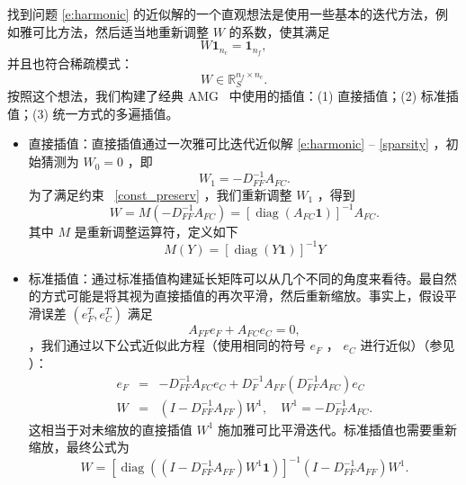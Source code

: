\documentclass[12pt]{acta_2011xz}
\begin{document}
找到问题    \eqref{e:harmonic}    的近似解的一个直观想法是使用一些基本的迭代方法，例如雅可比方法，然后适当地重新调整    $W$    的系数，使其满足    \begin{equation}\label{const_preserv}
     W\boldsymbol 1_{n_c}=\boldsymbol 1_{n_f},
 \end{equation}    并且也符合稀疏模式：
   \begin{equation}\label{sparsity}
     W\in \mathbb{R}_{S}^{n_f\times n_c}.
 \end{equation}    按照这个想法，我们构建了经典 AMG~    \cite[Section~A.7]{Trottenberg.U;Oosterlee.C;Schuller.A.2001a}    中使用的插值：(1) 直接插值；(2) 标准插值；(3) 统一方式的多遍插值。
   \begin{itemize}

   \item   直接插值：直接插值通过一次雅可比迭代近似解 
   \eqref{e:harmonic}    --    \eqref{sparsity}    ，初始猜测为    $W_0=0$    ，即
   $$W_1=-D_{FF}^{-1}A_{FC}.$$    为了满足约束~    \eqref{const_preserv}    ，我们重新调整    $W_1$    ，得到
   \begin{equation*}
\label{DirectW}
            W=M(-D_{FF}^{-1}A_{FC})=[\operatorname{diag}(A_{FC}\bm 1)]^{-1}A_{FC}.
        \end{equation*}    其中    $M$    是重新调整运算符，定义如下
   \begin{equation}\label{rescaling}
            M(Y)= [\operatorname{diag}(Y\bm{1})]^{-1}Y
        \end{equation}      \item   标准插值：通过标准插值构建延长矩阵可以从几个不同的角度来看待。最自然的方式可能是将其视为直接插值的再次平滑，然后重新缩放。事实上，假设平滑误差    $(e_F^T,e_C^T)$    满足 
   \[
        A_{FF} e_F +A_{FC}e_C = 0,
        \]    ，我们通过以下公式近似此方程（使用相同的符号    $e_F$    ，
   $e_C$    进行近似）（参见
   \cite{Trottenberg.U;Oosterlee.C;Schuller.A.2001a}    ）：
   \begin{eqnarray}
          e_F&=&-D_{FF}^{-1}A_{FC} e_C + D_F^{-1}A_{FF}(D_{FF}^{-1}A_{FC}) e_C\label{e:ec-ef} \\ 
          W &= & (I-D_{FF}^{-1}A_{FF}) W^1,\quad W^1=-D_{FF}^{-1}A_{FC}. \label{e:Wclassic}
        \end{eqnarray}    这相当于对未缩放的直接插值    $W^1$    施加雅可比平滑迭代。标准插值也需要重新缩放，最终公式为
   \begin{equation}\label{i:standard}
          W = 
 [\operatorname{diag}((I-D_{FF}^{-1}A_{FF})W^1\bm 1)]^{-1}(I-D_{FF}^{-1}A_{FF})W^1.

\end{equation}
\end{itemize}
\end{document}
